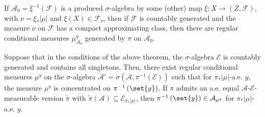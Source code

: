 \documentclass[10pt]{mypackage}
\begin{document}
\begin{remark}
  If $\mathcal{A}_0= \xi^{-1}\left( \mathcal{F} \right)$ is a produced $\sigma$-algebra by some (other) map $\xi\colon X\to \left( Z,\mathcal{F} \right)$, with $\nu = \xi_{\ast}\left\vert \mu \right\vert$ and $\xi(X)\in \mathcal{F}_{\nu}$, then if $\mathcal{F}$ is countably generated and the measure $\nu$ on $\mathcal{F}$ has a compact approximating class, then there are regular conditional measures $\mu^y_{\mathcal{A}_0}$ generated by $\pi$ on $\mathcal{A}_0$.
\end{remark}
\begin{corollary}
  Suppose that in the conditions of the above theorem, the $\sigma$-algebra $\mathcal{E}$ is countably generated and contains all singletons. Then, there exist regular conditional measures $\mu^y$ on the $\sigma$-algebra $\mathcal{A}' = \sigma\left( \mathcal{A},\pi^{-1}\left( \mathcal{E} \right) \right)$ such that for $\pi_{\ast}\left\vert \mu \right\vert$-a.e. $y$, the measure $\mu^y$ is concentrated on $\pi^{-1}\left( \set{y} \right)$. If $\pi$ admits an a.e. equal $\mathcal{A}$-$\mathcal{E}$-measurable version $ \widetilde{\pi} $ with $\widetilde{\pi}\left( \mathcal{A} \right)\subseteq \mathcal{E}_{\pi_{\ast}\left\vert \mu \right\vert}$, then $\pi^{-1}\left( \set{y} \right)\in \mathcal{A}_{\mu^{y}}$ for $\pi_{\ast}\left\vert \mu \right\vert$-a.e. $y$.
\end{corollary}
\end{document}
